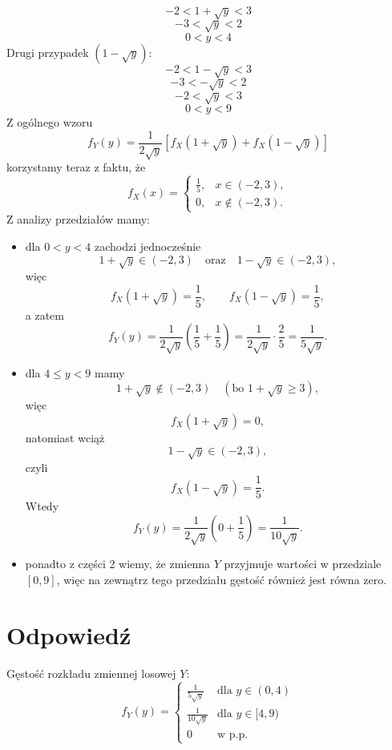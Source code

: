 \documentclass[polish, 10pt]{extarticle}
\begin{document}
\begin{equation*}
-2 < 1 + \sqrt{y} < 3
\end{equation*}
\begin{equation*}
-3 < \sqrt{y} < 2
\end{equation*}
\begin{equation*}
0 < y < 4
\end{equation*}
Drugi przypadek $(1-\sqrt{y})$:
\begin{equation*}
-2 < 1 - \sqrt{y} < 3
\end{equation*}
\begin{equation*}
-3 < - \sqrt{y} < 2
\end{equation*}
\begin{equation*}
-2 < \sqrt{y} < 3
\end{equation*}
\begin{equation*}
0 < y < 9
\end{equation*}
Z ogólnego wzoru
\[
    f_Y(y) = \frac{1}{2\sqrt{y}} \left[ f_X(1+\sqrt{y}) + f_X(1-\sqrt{y}) \right]
\]
korzystamy teraz z faktu, że
\[
    f_X(x) = \begin{cases}
        \frac{1}{5}, & x \in (-2,3),\\
        0, & x \notin (-2,3).
    \end{cases}
\]
Z analizy przedziałów mamy:
\begin{itemize}
    \item dla \(0 < y < 4\) zachodzi jednocześnie
    \[
        1+\sqrt{y} \in (-2,3) \quad \text{oraz} \quad 1-\sqrt{y} \in (-2,3),
    \]
    więc
    \[
        f_X(1+\sqrt{y}) = \frac{1}{5}, \qquad f_X(1-\sqrt{y}) = \frac{1}{5},
    \]
    a zatem
    \[
        f_Y(y) = \frac{1}{2\sqrt{y}}\left( \frac{1}{5} + \frac{1}{5} \right)
        = \frac{1}{2\sqrt{y}} \cdot \frac{2}{5}
        = \frac{1}{5\sqrt{y}}.
    \]
    \item dla \(4 \le y < 9\) mamy
    \[
        1+\sqrt{y} \notin (-2,3) \quad (\text{bo } 1+\sqrt{y} \ge 3),
    \]
    więc
    \[
        f_X(1+\sqrt{y}) = 0,
    \]
    natomiast wciąż
    \[
        1-\sqrt{y} \in (-2,3),
    \]
    czyli
    \[
        f_X(1-\sqrt{y}) = \frac{1}{5}.
    \]
    Wtedy
    \[
        f_Y(y) = \frac{1}{2\sqrt{y}}\left( 0 + \frac{1}{5} \right)
        = \frac{1}{10\sqrt{y}}.
    \]
    \item ponadto z części 2 wiemy, że zmienna \(Y\) przyjmuje wartości w przedziale \([0,9]\), więc na zewnątrz tego przedziału gęstość również jest równa zero.
\end{itemize}

\section*{Odpowiedź}
Gęstość rozkładu zmiennej losowej $Y$:
\begin{equation*}
    f_Y(y) = \begin{cases} 
        \frac{1}{5\sqrt{y}} & \text{dla } y \in (0, 4) \\[1em]
        \frac{1}{10\sqrt{y}} & \text{dla } y \in [4, 9) \\[1em]
        0 & \text{w p.p.}
    \end{cases}
\end{equation*}
\end{document}
